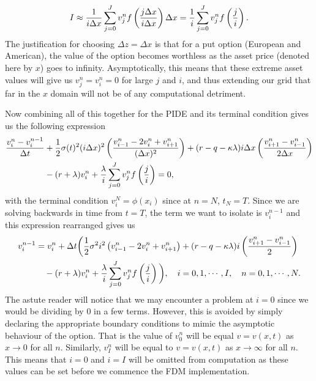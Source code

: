 	\begin{equation}
		\label{eqn:intDiscrete}
		I \approx \frac{1}{i\Delta x}\sum\limits_{j=0}^J v_j^n f\left( \frac{j\Delta x}{i \Delta x} \right) \Delta x = \frac{1}{i}\sum\limits_{j=0}^J v_j^n f\left( \frac{j}{i} \right).
	\end{equation}
The justification for choosing $\Delta z = \Delta x$ is that for a put option (European and American), the value of the option becomes worthless as the asset price (denoted here by $x$) goes to infinity. Asymptotically, this means that these extreme asset values will give us $v_j^n = v_i^n = 0$ for large $j$ and $i$, and thus extending our grid that far in the $x$ domain will not be of any computational detriment. 

Now combining all of this together for the PIDE and its terminal condition gives us the following expression
	\begin{equation*}
		\begin{split}
		\frac{v_i^n - v_i^{n-1}}{\Delta t} &+ \frac{1}{2}\sigma(t)^2(i\Delta x)^2\left(  \frac{v_{i-1}^n - 2v_i^n + v_{i+1}^n}{(\Delta x)^2} \right) + (r-q-\kappa\lambda)i\Delta x \left( \frac{ v_{i+1}^n - v_{i-1}^n}{2\Delta x} \right) \\
		&- (r+\lambda)v_i^n + \frac{\lambda}{i}\sum\limits_{j=0}^J v_j^n f\left( \frac{j}{i} \right) = 0,
			\end{split}
	\end{equation*}
with the terminal condition $v_i^N = \phi(x_i)$ since at $n=N$, $t_N = T$. Since we are solving backwards in time from $t=T$, the term we want to isolate is $v_i^{n-1}$ and this expression rearranged gives us
		\begin{equation}
		\label{eqn:FDMPIDE}
		\begin{split}
		v_i^{n-1} &= v_i^n + \Delta t \bigg( \frac{1}{2}\sigma^2i^2\left(  v_{i-1}^n - 2v_i^n + v_{i+1}^n \right) + (r-q-\kappa\lambda)i \left( \frac{ v_{i+1}^n - v_{i-1}^n}{2} \right) \\
		&\quad{} - (r+\lambda)v_i^n + \frac{\lambda}{i}\sum\limits_{j=0}^J v_j^n f\left( \frac{j}{i} \right) \bigg),  \quad i = 0,1,\cdots,I, \quad n = 0,1,\cdots,N.
			\end{split}
	\end{equation}
The astute reader will notice that we may encounter a problem at $i=0$ since we would be dividing by 0 in a few terms. However, this is avoided by simply declaring the appropriate boundary conditions to mimic the asymptotic behaviour of the option. That is the value of $v_0^n$ will be equal $v = v(x,t)$ as $x \rightarrow 0$ for all $n$. Similarly, $v_I^n$ will be equal to $v = v(x,t)$ as $x \rightarrow \infty$ for all $n$. This means that $i=0$ and $i=I$ will be omitted from computation as these values can be set before we commence the FDM implementation.

